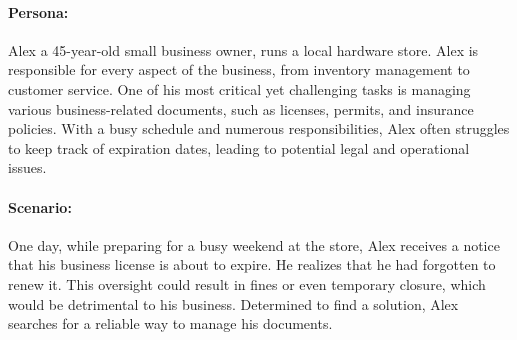 \begin{minipage}[t]{0.65\textwidth} %
	\paragraph{Persona:\\}
	\vspace{0pt} %
	\noindent
	\vbox{
		\vspace{5pt}
		Alex a 45-year-old small business owner, runs a local hardware store. Alex is responsible for every aspect of the business, from inventory management to customer service. One of his most critical yet challenging tasks is managing various business-related documents, such as licenses, permits, and insurance policies. With a busy schedule and numerous responsibilities, Alex often struggles to keep track of expiration dates, leading to potential legal and operational issues.
	}
	\paragraph{Scenario:\\}
	\vspace{0pt} %
	\noindent
	\vbox{
		\vspace{5pt}
		One day, while preparing for a busy weekend at the store, Alex receives a notice that his business license is about to expire. He realizes that he had forgotten to renew it. This oversight could result in fines or even temporary closure, which would be detrimental to his business. Determined to find a solution, Alex searches for a reliable way to manage his documents.
	}
\end{minipage}
